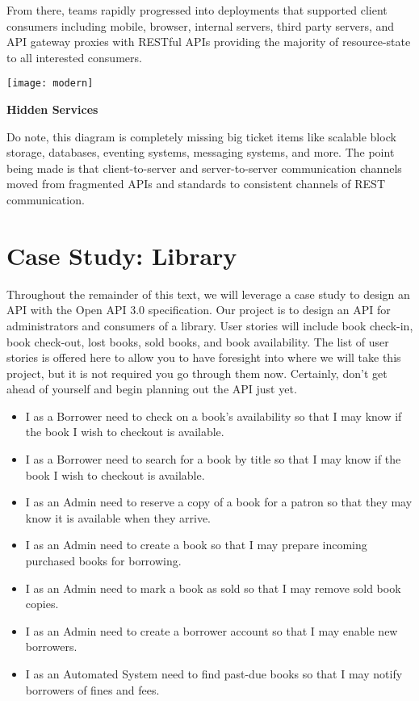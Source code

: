 From there, teams rapidly progressed into deployments that supported client consumers including mobile, browser, internal servers, third party servers, and API gateway proxies with RESTful APIs providing the majority of resource-state to all interested consumers.

\texttt{[image: modern]}

\begin{sidebar}
\begin{center}
\textbf{Hidden Services}
\end{center}

Do note, this diagram is completely missing big ticket items like scalable block storage, databases, eventing systems, messaging systems, and more.  The point being made is that client-to-server and server-to-server communication channels moved from fragmented APIs and standards to consistent channels of REST communication.

\end{sidebar}

\section{Case Study: Library}

Throughout the remainder of this text, we will leverage a case study to design an API with the Open API 3.0 specification.  Our project is to design an API for administrators and consumers of a library.  User stories will include book check-in, book check-out, lost books, sold books, and book availability.  The list of user stories is offered here to allow you to have foresight into where we will take this project, but it is not required you go through them now.  Certainly, don't get ahead of yourself and begin planning out the API just yet.

\begin{itemize}
  \item I as a Borrower need to check on a book's availability so that I may know if the book I wish to checkout is available.
  \item I as a Borrower need to search for a book by title so that I may know if the book I wish to checkout is available.
  \item I as an Admin need to reserve a copy of a book for a patron so that they may know it is available when they arrive.
  \item I as an Admin need to create a book so that I may prepare incoming purchased books for borrowing.
  \item I as an Admin need to mark a book as sold so that I may remove sold book copies.
  \item I as an Admin need to create a borrower account so that I may enable new borrowers.
  \item I as an Automated System need to find past-due books so that I may notify borrowers of fines and fees.
\end{itemize}

